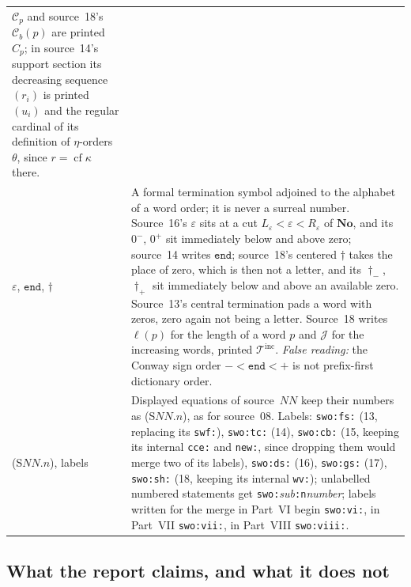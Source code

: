 \documentclass[11pt]{article}
\theoremstyle{definition}
\theoremstyle{remark}
\newcommand{\No}{\mathbf{No}}
\newcommand{\cf}{\operatorname{cf}}
\newcommand{\End}{\mathtt{end}}
\newcommand{\code}[1]{\texttt{\small #1}}
\newcommand{\WordsInc}{\mathcal T^{\mathrm{inc}}}
\begin{document}
\begin{longtable}{@{}>{\raggedright\arraybackslash}p{}>{\raggedright\arraybackslash}p{}@{}}
$\mathcal C_p$ and source~18's $\mathcal C_b(p)$ are printed $C_p$; in
source~14's support section its decreasing sequence $(r_i)$ is printed
$(u_i)$ and the regular cardinal of its definition of $\eta$-orders
$\theta$, since $r=\cf\kappa$ there.\\[3pt]
$\varepsilon$, $\End$, $\dagger$ &
A formal termination symbol adjoined to the alphabet of a word order; it is
never a surreal number. Source~16's $\varepsilon$ sits at a cut
$L_\varepsilon<\varepsilon<R_\varepsilon$ of $\No$, and its $0^-$, $0^+$ sit
immediately below and above zero; source~14 writes $\End$; source~18's
centered $\dagger$ takes the place of zero, which is then not a letter, and
its $\dagger_-$, $\dagger_+$ sit immediately below and above an available
zero. Source~13's central termination pads a word with zeros, zero again not
being a letter. Source~18 writes $\ell(p)$ for the length of a word $p$ and
$\mathcal J$ for the increasing words, printed $\WordsInc$. \emph{False
reading:} the Conway sign order $-<\End<+$ is not prefix-first dictionary
order.\\[3pt]
(S$NN$.$n$), labels &
Displayed equations of source~$NN$ keep their numbers as (S$NN$.$n$), as for
source~08. Labels: \code{swo:fs:} (13, replacing its \code{swf:}),
\code{swo:tc:} (14), \code{swo:cb:} (15, keeping its internal \code{cce:} and
\code{new:}, since dropping them would merge two of its labels),
\code{swo:ds:} (16), \code{swo:gs:} (17), \code{swo:sh:} (18, keeping its
internal \code{wv:}); unlabelled numbered statements get
\code{swo:}\emph{sub}\code{:n}\emph{number}; labels written for the merge in
Part~VI begin \code{swo:vi:}, in Part~VII \code{swo:vii:}, in Part~VIII
\code{swo:viii:}.\\
\bottomrule
\end{longtable}
\endgroup

\subsection{What the report claims, and what it does not}\label{swo:sec:claims}
\end{document}
